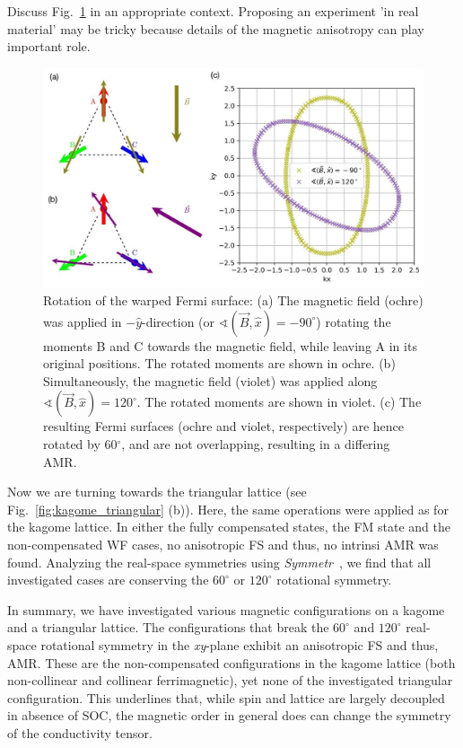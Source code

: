 \documentclass[prb,showpacs,amsmath,amssymb,superscriptaddress,twocolumn,floatfix]{revtex4-1}
\begin{document}
{\color{red} Discuss Fig.~\ref{fig:fs-rotation} in an appropriate context.} 
Proposing an experiment 'in real material' may be tricky because details of the
magnetic anisotropy can play important role.

\begin{figure}
	\centering
	\includegraphics[width=1\linewidth]{img/FS-rotation}
	\caption{Rotation of the warped Fermi surface: 
		(a) The magnetic field (ochre) was applied in $-\hat{y}$-direction (or $\sphericalangle (\vec{B}, \hat{x}) = -90^\circ$) rotating the moments B and C towards the magnetic field, while leaving A in its original positions. The rotated moments are shown in ochre. (b) Simultaneously, the magnetic field (violet) was applied along $\sphericalangle (\vec{B}, \hat{x}) = 120^\circ$. The rotated moments are shown in violet. (c) The resulting Fermi surfaces (ochre and violet, respectively) are hence rotated by 60$^\circ$, and are not overlapping, resulting in a differing AMR.}
	\label{fig:fs-rotation}
\end{figure}

Now we are turning towards the triangular lattice (see Fig.~\ref{fig:kagome_triangular} (b)). Here, the same operations were applied as for the kagome lattice. In either the fully compensated states, the FM state and the non-compensated WF cases, no anisotropic FS and thus, no intrinsi AMR was found. Analyzing the real-space symmetries using \textit{Symmetr}~\cite{Symmetr}, we find that all investigated cases are conserving the $60^\circ$ or $120^\circ$ rotational symmetry. 

In summary, we have investigated various magnetic configurations on a kagome and a triangular lattice. The configurations that break the $60^\circ$ and $120^\circ$ real-space rotational symmetry in the \textit{xy}-plane exhibit an anisotropic FS and thus, AMR. These are the non-compensated configurations in the kagome lattice (both non-collinear and collinear ferrimagnetic), yet none of the investigated triangular configuration. This underlines that, while spin and lattice are largely decoupled~\cite{Gonzalez-Hernandez:2024} in absence of SOC, the magnetic order in general does can change the symmetry of the conductivity tensor.
\end{document}
